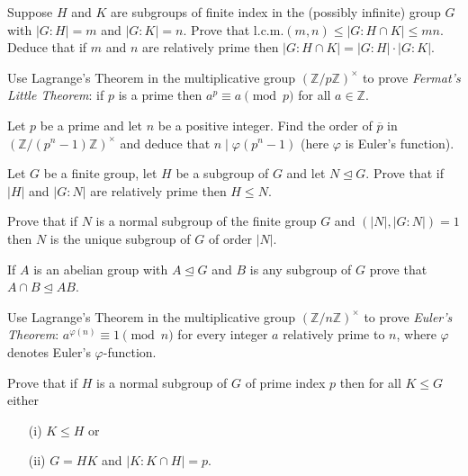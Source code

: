 \documentclass[
    11pt,a4paper,
]{exam}
\begin{document}
\begin{questions}
\question 
Suppose $H$ and $K$ are subgroups of finite index in the (possibly infinite) group $G$ with $|G : H| = m$ and $|G : K| = n$. Prove that $\mathrm{l.c.m.}(m, n) \leq |G : H \cap K| \leq mn$. Deduce that if $m$ and $n$ are relatively prime then $|G : H \cap K| = |G : H| \cdot |G : K|$.




\question 
Use Lagrange's Theorem in the multiplicative group $(\mathbb{Z}/p\mathbb{Z})^\times$ to prove \textit{Fermat's Little Theorem}: if $p$ is a prime then $a^p \equiv a \pmod{p}$ for all $a \in \mathbb{Z}$.






\question 
Let $p$ be a prime and let $n$ be a positive integer. Find the order of $\overline{p}$ in $(\mathbb{Z}/(p^n-1)\mathbb{Z})^\times$ and deduce that $n \mid \varphi(p^n - 1)$ (here $\varphi$ is Euler's function).






\question 
Let $G$ be a finite group, let $H$ be a subgroup of $G$ and let $N \unlhd G$. Prove that if $|H|$ and $|G : N|$ are relatively prime then $H \leq N$.





\question 
Prove that if $N$ is a normal subgroup of the finite group $G$ and $(|N|, |G : N|) = 1$ then $N$ is the unique subgroup of $G$ of order $|N|$.



\question
If $A$ is an abelian group with $A \unlhd G$ and $B$ is any subgroup of $G$ prove that $A \cap B \unlhd AB$.




\question
Use Lagrange's Theorem in the multiplicative group $(\mathbb{Z}/n\mathbb{Z})^\times$ to prove \textit{Euler's Theorem}: $a^{\varphi(n)} \equiv 1 \pmod{n}$ for every integer $a$ relatively prime to $n$, where $\varphi$ denotes Euler's $\varphi$-function.







\question
Prove that if $H$ is a normal subgroup of $G$ of prime index $p$ then for all $K \leq G$ either
   \begin{itemize}
     \item[(i)] $K \leq H$ or
     \item[(ii)] $G = HK$ and $|K : K \cap H| = p$.
   \end{itemize}





\end{questions}
\end{document}
